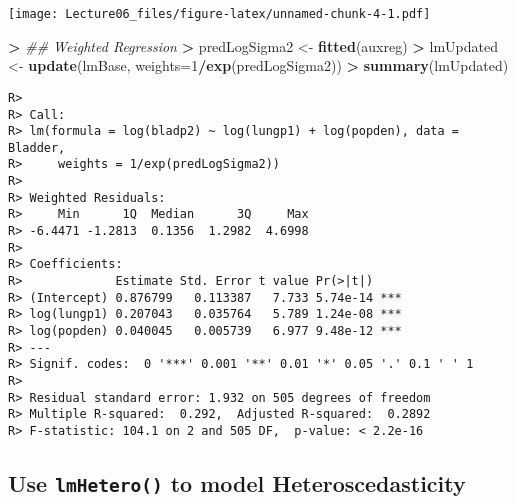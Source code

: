 \documentclass[
]{article}
\newenvironment{Shaded}{\begin{snugshade}}{\end{snugshade}}
\newcommand{\CommentTok}[1]{\textcolor[rgb]{0.56,0.35,0.01}{\textit{#1}}}
\newcommand{\DataTypeTok}[1]{\textcolor[rgb]{0.13,0.29,0.53}{#1}}
\newcommand{\DecValTok}[1]{\textcolor[rgb]{0.00,0.00,0.81}{#1}}
\newcommand{\ErrorTok}[1]{\textcolor[rgb]{0.64,0.00,0.00}{\textbf{#1}}}
\newcommand{\KeywordTok}[1]{\textcolor[rgb]{0.13,0.29,0.53}{\textbf{#1}}}
\newcommand{\NormalTok}[1]{#1}
\newcommand{\OperatorTok}[1]{\textcolor[rgb]{0.81,0.36,0.00}{\textbf{#1}}}
\newcommand{\StringTok}[1]{\textcolor[rgb]{0.31,0.60,0.02}{#1}}
\begin{document}
\begin{Shaded}
\end{Shaded}

\texttt{[image: Lecture06\_files/figure-latex/unnamed-chunk-4-1.pdf]}

\begin{Shaded}
\begin{Highlighting}[]
\OperatorTok{>}\StringTok{ }\CommentTok{## Weighted Regression}
\ErrorTok{>}\StringTok{ }\NormalTok{predLogSigma2 <-}\StringTok{ }\KeywordTok{fitted}\NormalTok{(auxreg)}
\OperatorTok{>}\StringTok{ }\NormalTok{lmUpdated <-}\StringTok{ }\KeywordTok{update}\NormalTok{(lmBase, }\DataTypeTok{weights=}\DecValTok{1}\OperatorTok{/}\KeywordTok{exp}\NormalTok{(predLogSigma2))}
\OperatorTok{>}\StringTok{ }\KeywordTok{summary}\NormalTok{(lmUpdated)}
\end{Highlighting}
\end{Shaded}

\begin{verbatim}
R> 
R> Call:
R> lm(formula = log(bladp2) ~ log(lungp1) + log(popden), data = Bladder, 
R>     weights = 1/exp(predLogSigma2))
R> 
R> Weighted Residuals:
R>     Min      1Q  Median      3Q     Max 
R> -6.4471 -1.2813  0.1356  1.2982  4.6998 
R> 
R> Coefficients:
R>             Estimate Std. Error t value Pr(>|t|)    
R> (Intercept) 0.876799   0.113387   7.733 5.74e-14 ***
R> log(lungp1) 0.207043   0.035764   5.789 1.24e-08 ***
R> log(popden) 0.040045   0.005739   6.977 9.48e-12 ***
R> ---
R> Signif. codes:  0 '***' 0.001 '**' 0.01 '*' 0.05 '.' 0.1 ' ' 1
R> 
R> Residual standard error: 1.932 on 505 degrees of freedom
R> Multiple R-squared:  0.292,  Adjusted R-squared:  0.2892 
R> F-statistic: 104.1 on 2 and 505 DF,  p-value: < 2.2e-16
\end{verbatim}

\hypertarget{use-lmhetero-to-model-heteroscedasticity}{%
\subsection{\texorpdfstring{Use \texttt{lmHetero()} to model
Heteroscedasticity}{Use lmHetero() to model Heteroscedasticity}}\label{use-lmhetero-to-model-heteroscedasticity}}
\end{document}
